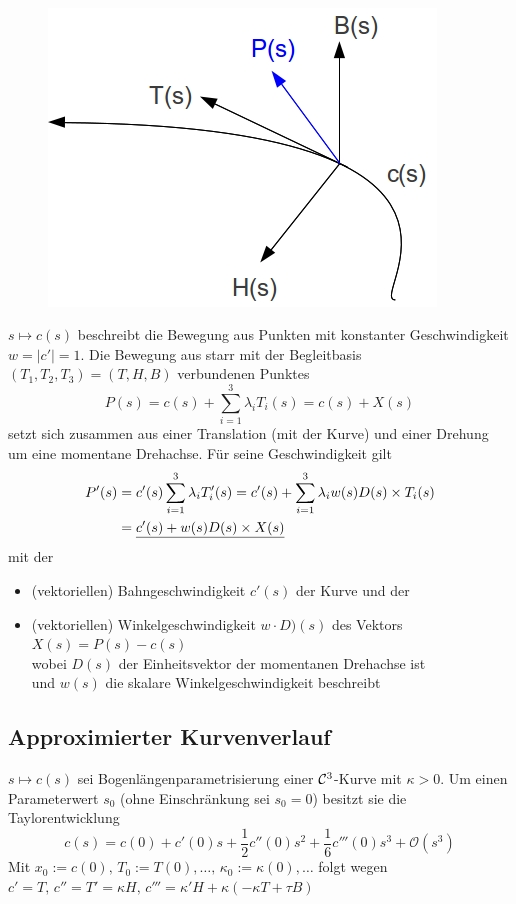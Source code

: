 \begin{kin} \(\)
\begin{figure}[ht]
 \centering
 \includegraphics[scale=0.4]{Bilder/Bsp3.jpg}
\end{figure}

 \(s \mapsto c(s)\) beschreibt die Bewegung aus Punkten mit konstanter Geschwindigkeit \(w = |c'| = 1\). Die Bewegung aus starr mit der Begleitbasis \((T_1,T_2,T_3) = (T, H, B)\) verbundenen Punktes
 \[
  P(s) = c(s) + \sum_{i=1}^3 \lambda_i T_i(s) = c(s) + X(s)
 \]
setzt sich zusammen aus einer Translation (mit der Kurve) und einer Drehung um eine momentane Drehachse. Für seine Geschwindigkeit gilt
\begin{align*}
 P'(s) &= c'(s) \sum_{i=1}^3 \lambda_i T_i' (s) = c'(s) + \sum_{i=1}^3 \lambda_i w(s) D(s) \times T_i(s) \\
 &=\uline{c'(s) + w(s) D(s) \times X(s)}
\end{align*}
mit der
\begin{itemize}
 \item (vektoriellen) Bahngeschwindigkeit \(c'(s)\) der Kurve und der 
 \item (vektoriellen) Winkelgeschwindigkeit \(w\cdot D)(s)\) des Vektors \(X(s) = P(s) - c(s)\) \\
 wobei \(D(s)\) der Einheitsvektor der momentanen Drehachse ist \\
 und \(w(s)\)  die skalare Winkelgeschwindigkeit beschreibt
\end{itemize}

\end{kin}

\subsection{Approximierter Kurvenverlauf}
\(s \mapsto c(s)\) sei Bogenlängenparametrisierung einer \(\mathcal{C}^3\)-Kurve mit \(\kappa > 0\). Um einen Parameterwert \(s_0\) (ohne Einschränkung sei \(s_0 = 0\)) besitzt sie die Taylorentwicklung
\[
 c(s) = c(0) + c'(0) s + \frac12 c''(0) s^2 + \frac16 c'''(0) s^3 + \mathcal O(s^3)
\]
Mit \(x_0:= c(0),\, T_0 := T(0), \dots,\, \kappa_0 := \kappa(0), \dots\) folgt wegen \(c' = T,\, c'' = T' = \kappa H,\, c''' = \kappa' H + \kappa (-\kappa T + \tau B)\)


